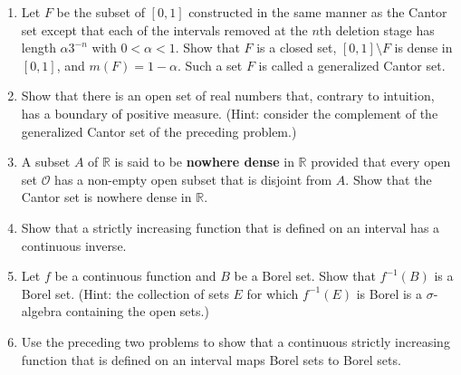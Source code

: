 \begin{enumerate}
	\item Let $F$ be the subset of $[0,1]$ constructed in the same manner as the Cantor set except that each of the intervals removed at the $n$th deletion stage has length $\alpha 3^{-n}$ with $0<\alpha<1$.
	Show that $F$ is a closed set, $[0,1]\setminus F$ is dense in $[0,1]$, and $m(F)=1-\alpha$. Such a set $F$ is called a generalized Cantor set.
	\item Show that there is an open set of real numbers that, contrary to intuition, has a boundary of positive measure. (Hint: consider the complement of the generalized Cantor set of the preceding problem.)
	\item A subset $A$ of $\mathbb{R}$ is said to be \textbf{nowhere dense} in $\mathbb{R}$ provided that every open set $\mathcal{O}$ has a non-empty open subset that is disjoint from $A$. Show that the Cantor set is nowhere dense in $\mathbb{R}$.
	\item Show that a strictly increasing function that is defined on an interval has a continuous inverse.
	\item Let $f$ be a continuous function and $B$ be a Borel set. Show that $f^{-1}(B)$ is a Borel set. (Hint: the collection of sets $E$ for which $f^{-1}(E)$ is Borel is a $\sigma$-algebra containing the open sets.)
	\item Use the preceding two problems to show that a continuous strictly increasing function that is defined on an interval maps Borel sets to Borel sets.
\end{enumerate}	
